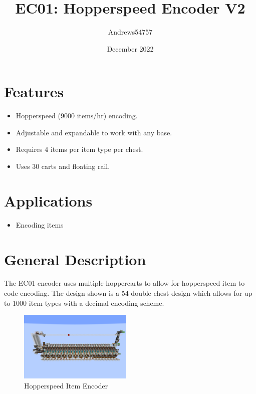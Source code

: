 \documentclass[10pt]{datasheet}
\title{EC01: Hopperspeed Encoder V2}
\author{Andrews54757}
\date{December 2022}
\begin{document}
\maketitle

\section{Features}

\begin{itemize}
\item{Hopperspeed (9000 items/hr) encoding.}
\item{Adjustable and expandable to work with any base.}
\item{Requires 4 items per item type per chest.}
\item{Uses 30 carts and floating rail.}
\end{itemize}

\section{Applications}

\begin{itemize}
\item{Encoding items}
\end{itemize}

\section{General Description}
The EC01 encoder uses multiple hoppercarts to allow for hopperspeed item to code encoding. The design shown is a 54 double-chest design which allows for up to 1000 item types with a decimal encoding scheme.
\vfill\break

\begin{figure}[h]
    \centering
    \includegraphics[width=0.48\textwidth]{encoder.png}
    \caption{\centering Hopperspeed Item Encoder}
\end{figure}

\onecolumn
\end{document}
